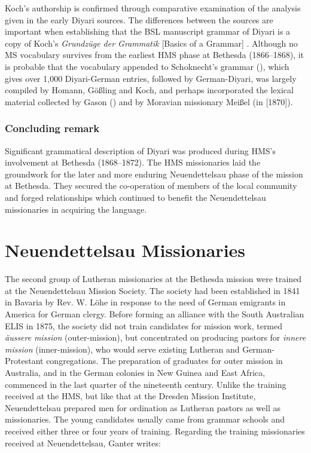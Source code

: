Koch’s authorship is confirmed through comparative examination of the analysis given in the early Diyari sources. The differences between the sources are important when establishing that the BSL manuscript grammar of Diyari is a copy of Koch’s \textit{Grundzüge der Grammatik} [Basics of a Grammar] \citeyearpar{koch_untitled_1868}. Although no MS vocabulary survives from the earliest HMS phase at Bethesda (1866--1868), it is probable that the vocabulary appended to Schoknecht’s grammar (\citeyear{schoknecht_grammar_1947}), which gives over 1,000 Diyari-German entries, followed by German-Diyari, was largely compiled by Homann, Gößling and Koch, and perhaps incorporated the lexical material collected by Gason () and by Moravian missionary Meißel (in \citealt{taplin_notes_1872}[1870]).

\subsubsection{Concluding remark}
\label{sec:key:8.3.4.1}

Significant grammatical description of Diyari was produced during HMS's involvement at Bethesda (1868--1872). The HMS missionaries laid the groundwork for the later and more enduring Neuendettelsau phase of the mission at Bethesda. They secured the co-operation of members of the local community and forged relationships which continued to benefit the Neuendettelsau missionaries in acquiring the language.

\section{Neuendettelsau Missionaries}
\label{sec:key:8.4}

The second group of Lutheran missionaries at the Bethesda mission were trained at the Neuendettelsau Mission Society. The society had been established in 1841 in Bavaria by Rev. W. Löhe in response to the need of German emigrants in America for German clergy. Before forming an alliance with the South Australian ELIS in 1875, the society did not train candidates for mission work, termed \textit{äussere} \textit{mission} (outer-mission), but concentrated on producing pastors for \textit{innere} \textit{mission} (inner-mission), who would serve existing Lutheran and German-Protestant congregations. The preparation of graduates for outer mission in Australia, and in the German colonies in New Guinea and East Africa, commenced in the last quarter of the nineteenth century. Unlike the training received at the HMS, but like that at the Dresden Mission Institute, Neuendettelsau prepared men for ordination as Lutheran pastors as well as missionaries. The young candidates usually came from grammar schools and received either three or four years of training. Regarding the training missionaries received at Neuendettelsau, Ganter writes:

